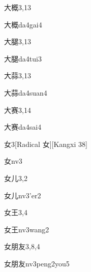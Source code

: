 \begin{entry}{大概}{3,13}
  \begin{phonetics}{大概}{da4gai4}
  \end{phonetics}
\end{entry}

\begin{entry}{大腿}{3,13}
  \begin{phonetics}{大腿}{da4tui3}
  \end{phonetics}
\end{entry}

\begin{entry}{大蒜}{3,13}
  \begin{phonetics}{大蒜}{da4suan4}
  \end{phonetics}
\end{entry}

\begin{entry}{大赛}{3,14}
  \begin{phonetics}{大赛}{da4sai4}
  \end{phonetics}
\end{entry}

\begin{entry}{女}{3}[Radical 女][Kangxi 38]
  \begin{phonetics}{女}{nv3}
  \end{phonetics}
\end{entry}

\begin{entry}{女儿}{3,2}
  \begin{phonetics}{女儿}{nv3'er2}
  \end{phonetics}
\end{entry}

\begin{entry}{女王}{3,4}
  \begin{phonetics}{女王}{nv3wang2}
  \end{phonetics}
\end{entry}

\begin{entry}{女朋友}{3,8,4}
  \begin{phonetics}{女朋友}{nv3peng2you5}
  \end{phonetics}
\end{entry}

